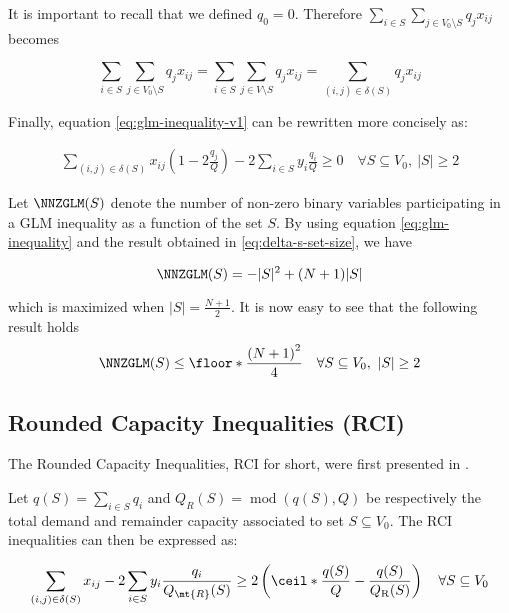 It is important to recall that we defined $q_0 = 0$.
Therefore $\sum_{i \in S} \sum_{j \in V_0 \setminus S} q_j  x_{ij}$ becomes

\begin{equation}
	\sum_{i \in S} \sum_{j \in V_0 \setminus S} q_j  x_{ij} = \sum_{i \in S} \sum_{j \in V \setminus S} q_j  x_{ij} = \sum_{(i, j) \in \delta(S)} q_j x_{ij}
\end{equation}

Finally, equation \eqref{eq:glm-inequality-v1} can be rewritten more concisely as:

\begin{equation}\label{eq:glm-inequality}
	\begin{split}
		\sum_{(i, j) \in \delta(S)} x_{ij} \left( 1 - 2 \frac{q_j}{Q} \right)  -2 \sum_{i \in S} y_i \frac{q_i}{Q}  \ge  0   \quad \forall S \subseteq V_0,\ |S| \ge 2
	\end{split}
\end{equation}


Let $\NNZGLM(S)$ denote the number of non-zero binary variables participating in a GLM inequality as a function of the set $S$.
By using equation \eqref{eq:glm-inequality} and the result obtained in \eqref{eq:delta-s-set-size}, we have

\begin{equation}
	\NNZGLM(S) = -|S|^2 + (N + 1)|S|
\end{equation}

which is maximized when $|S| = \frac{N+1}{2}$.
It is now easy to see that the following result holds
\begin{equation}\label{eq:glm-nnz-ub}
	\NNZGLM(S) \le \floor*{ \frac{\left( N + 1 \right)^2}{4}} \quad \forall S \subseteq V_0,\ |S| \ge 2
\end{equation}


\subsection{Rounded Capacity Inequalities (RCI)}
The Rounded Capacity Inequalities, RCI for short, were first presented in \cite{achuthan_capacitated_1998}.

Let $q(S) = \sum_{i \in S} q_i$ and $Q_{R}(S) = \mathop{mod}\left(q(S), Q \right)$ be respectively the total demand and remainder capacity associated to set $S \subseteq V_0$.
The RCI inequalities can then be expressed as:

\begin{equation}\label{eq:rci-inequality}
	\begin{split}
		\sum_{(i, j) \in \delta(S)} x_{ij} -2 \sum_{i \in S} y_i {\frac{q_i}{Q_\mt{R}(S)}}    \ge   2 \left( \ceil*{ \frac{q(S)}{Q}} - \frac{q(S)}{Q_{\mathrm{R}}(S)} \right) \quad \forall S \subseteq V_0
	\end{split}
\end{equation}


